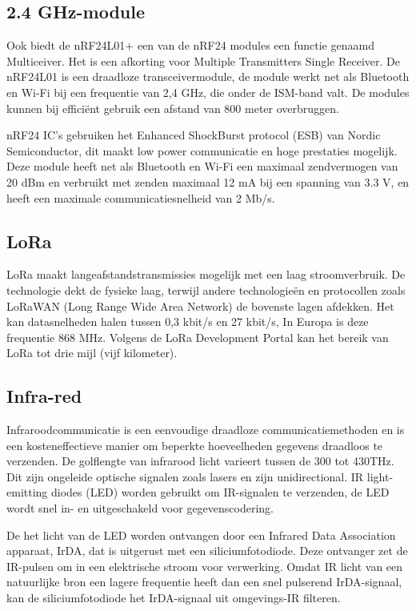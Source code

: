 \subsection{2.4 GHz-module}
Ook biedt de nRF24L01+ een van de nRF24 modules een functie genaamd Multiceiver. Het is een afkorting voor Multiple Transmitters Single Receiver. De nRF24L01 is een draadloze transceivermodule, de module werkt net als Bluetooth en Wi-Fi bij een frequentie van 2,4 GHz, die onder de ISM-band valt. De modules kunnen bij efficiënt gebruik een afstand van 800 meter overbruggen\cite{nordic_nrf24}. 

nRF24 IC's gebruiken het Enhanced ShockBurst protocol (ESB) van Nordic Semiconductor, dit maakt low power communicatie en hoge prestaties mogelijk. Deze module heeft net als Bluetooth en Wi-Fi een maximaal zendvermogen van 20 dBm en verbruikt met zenden maximaal 12 mA bij een spanning van 3.3 V, en heeft een maximale communicatiesnelheid van 2 Mb/s\cite{digikey_lp_wireless}.


\subsection{LoRa}
LoRa maakt langeafstandstransmissies mogelijk met een laag stroomverbruik. De technologie dekt de fysieke laag, terwijl andere technologieën en protocollen zoals LoRaWAN (Long Range Wide Area Network) de bovenste lagen afdekken. Het kan datasnelheden halen tussen 0,3 kbit/s en 27 kbit/s, In Europa is deze frequentie 868 MHz. Volgens de LoRa Development Portal kan het bereik van LoRa tot drie mijl (vijf kilometer). \cite{rf_lora}


\subsection{Infra-red}
Infraroodcommunicatie is een eenvoudige draadloze communicatiemethoden en is een kosteneffectieve manier om beperkte hoeveelheden gegevens draadloos te verzenden. De golflengte van infrarood licht varieert tussen de 300 tot 430THz. Dit zijn ongeleide optische signalen zoals lasers en zijn unidirectional. IR light-emitting diodes (LED) worden gebruikt om IR-signalen te verzenden, de LED wordt snel in- en uitgeschakeld voor gegevenscodering\cite{techopedia_ir}. 

De het licht van de LED worden ontvangen door een Infrared Data Association apparaat, IrDA, dat is uitgerust met een siliciumfotodiode. Deze ontvanger zet de IR-pulsen om in een elektrische stroom voor verwerking. Omdat IR licht van een natuurlijke bron een lagere frequentie heeft dan een snel pulserend IrDA-signaal, kan de siliciumfotodiode het IrDA-signaal uit omgevings-IR filteren.

